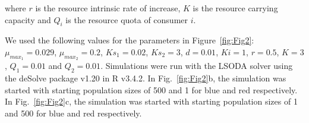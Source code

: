\noindent where $r$ is the resource intrinsic rate of increase, $K$ is the resource carrying capacity and $Q_{i}$ is the resource quota of consumer $i$. 
\par


We used the following values for the parameters in Figure~\ref{fig:Fig2}: $\mu_{max_{1}} = 0.029$, $\mu_{max_{2}} = 0.2$, $Ks_{1} = 0.02$, $Ks_{2} = 3$, $d = 0.01$, $Ki = 1$, $r = 0.5$, $K = 3$, $Q_{1} = 0.01$ and $Q_{2} = 0.01$. Simulations were run with the LSODA solver using the deSolve package v1.20 \citep{soetaert2016package} in R v3.4.2. In Fig.~\ref{fig:Fig2}b, the simulation was started with starting population sizes of 500 and 1 for blue and red respectively. In Fig.~\ref{fig:Fig2}c, the simulation was started with starting population sizes of 1 and 500 for blue and red respectively. 

